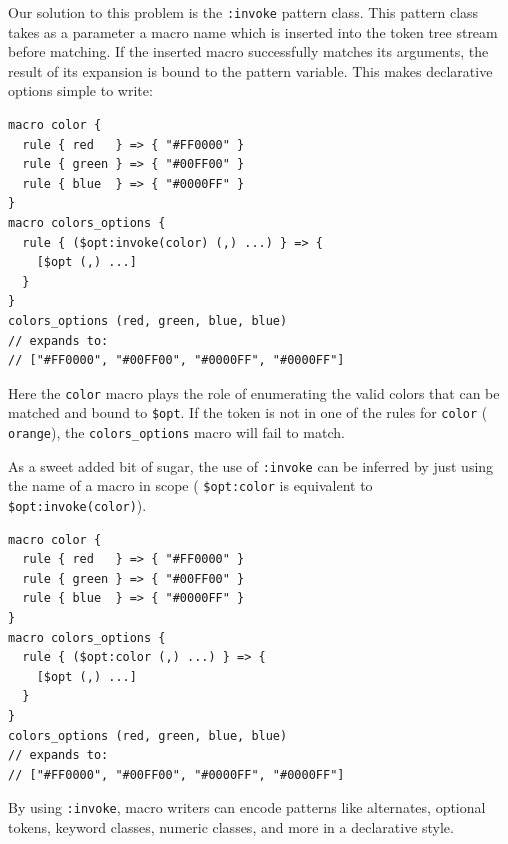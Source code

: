 \documentclass[preprint,10pt]{sigplanconf}
\begin{document}
Our solution to this problem is the \verb!:invoke! pattern class.
This pattern class takes as a parameter a macro name which is inserted
into the token tree stream before matching. If the inserted macro
successfully matches its arguments, the result of its expansion is
bound to the pattern variable. This makes declarative options simple
to write:
\begin{lstlisting}
macro color {
  rule { red   } => { "#FF0000" }
  rule { green } => { "#00FF00" }
  rule { blue  } => { "#0000FF" }
}
macro colors_options {
  rule { ($opt:invoke(color) (,) ...) } => { 
    [$opt (,) ...]
  }
}
colors_options (red, green, blue, blue)
// expands to:
// ["#FF0000", "#00FF00", "#0000FF", "#0000FF"]
\end{lstlisting}
Here the \verb!color! macro plays the role of enumerating the
valid colors that can be matched and bound to \verb!$opt!.
If the token is not in one of the rules for \verb!color! (\eg
\verb!orange!), the \verb!colors_options! macro will fail to match.

As a sweet added bit of sugar, the use of \verb!:invoke! can be
inferred by just using the name of a macro in scope (\ie
\verb!$opt:color! is equivalent to
\verb!$opt:invoke(color)!).

\begin{lstlisting}
macro color {
  rule { red   } => { "#FF0000" }
  rule { green } => { "#00FF00" }
  rule { blue  } => { "#0000FF" }
}
macro colors_options {
  rule { ($opt:color (,) ...) } => { 
    [$opt (,) ...]
  }
}
colors_options (red, green, blue, blue)
// expands to:
// ["#FF0000", "#00FF00", "#0000FF", "#0000FF"]
\end{lstlisting}

By using \verb!:invoke!, macro writers can encode patterns
like alternates, optional tokens, keyword classes, numeric classes,
and more in a declarative style.



\end{document}
